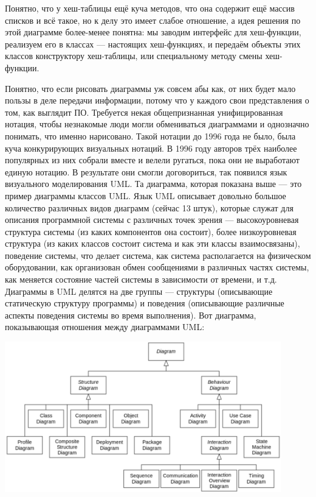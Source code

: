 \documentclass[a5paper]{article}
\begin{document}
Понятно, что у хеш-таблицы ещё куча методов, что она содержит ещё массив списков и всё такое, но к делу это имеет слабое отношение, а идея решения по этой диаграмме более-менее понятна: мы заводим интерфейс для хеш-функции, реализуем его в классах --- настоящих хеш-функциях, и передаём объекты этих классов конструктору хеш-таблицы, или специальному методу смены хеш-функции.

Понятно, что если рисовать диаграммы уж совсем абы как, от них будет мало пользы в деле передачи информации, потому что у каждого свои представления о том, как выглядит ПО. Требуется некая общепризнанная унифицированная нотация, чтобы незнакомые люди могли обмениваться диаграммами и однозначно понимать, что именно нарисовано. Такой нотации до 1996 года не было, была куча конкурирующих визуальных нотаций. В 1996 году авторов трёх наиболее популярных из них собрали вместе и велели ругаться, пока они не выработают единую нотацию. В результате они смогли договориться, так появился язык визуального моделирования UML. Та диаграмма, которая показана выше --- это пример диаграммы классов UML. Язык UML описывает довольно большое количество различных видов диаграмм (сейчас 13 штук), которые служат для описания программной системы с различных точек зрения --- высокоуровневая структура системы (из каких компонентов она состоит), более низкоуровневая структура (из каких классов состоит система и как эти классы взаимосвязаны), поведение системы, что делает система, как система располагается на физическом оборудовании, как организован обмен сообщениями в различных частях системы, как меняется состояние частей системы в зависимости от времени, и т.д. Диаграммы в UML делятся на две группы --- структуры (описывающие статическую структуру программы) и поведения (описывающие различные аспекты поведения системы во время выполнения). Вот диаграмма, показывающая отношения между диаграммами UML:

\begin{center}
	\includegraphics[width=0.9\textwidth]{umlDiagrams.png}
\end{center}
\end{document}
